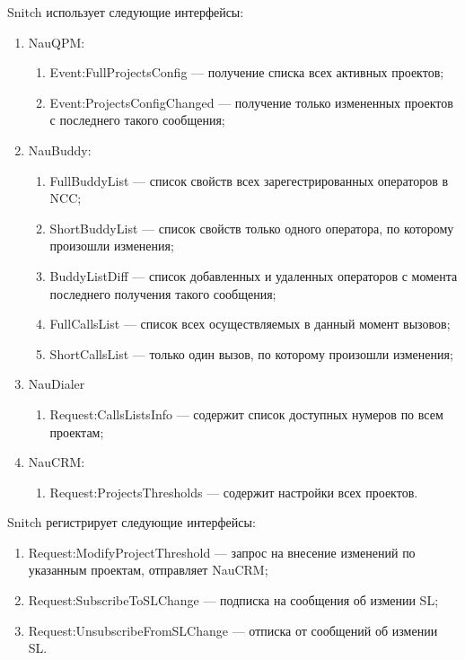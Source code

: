 Snitch использует следующие интерфейсы:
\begin{enumerate} %
    \item NauQPM:
    \begin{enumerate}
        \item Event:FullProjectsConfig --- получение списка всех активных проектов;
        \item Event:ProjectsConfigChanged --- получение только измененных проектов с последнего такого сообщения;
    \end{enumerate}
    \item NauBuddy:
    \begin{enumerate}
        \item FullBuddyList --- список свойств всех зарегестрированных операторов в NCC;
        \item ShortBuddyList --- список свойств только одного оператора, по которому произошли изменения;
        \item BuddyListDiff --- список добавленных и удаленных операторов с момента последнего получения такого сообщения;
        \item FullCallsList --- список всех осуществляемых в данный момент вызовов;
        \item ShortCallsList --- только один вызов, по которому произошли изменения;
    \end{enumerate}
    \item NauDialer
    \begin{enumerate}
        \item Request:CallsListsInfo --- содержит список доступных нумеров по всем проектам;
    \end{enumerate}
    \item NauCRM:
    \begin{enumerate}
        \item Request:ProjectsThresholds --- содержит настройки всех проектов.
    \end{enumerate}
\end{enumerate}

Snitch регистрирует следующие интерфейсы:
\begin{enumerate} %
    \item Request:ModifyProjectThreshold --- запрос на внесение изменений по указанным проектам, отправляет NauCRM;
    \item Request:SubscribeToSLChange --- подписка на сообщения об измении SL\@; %
    \item Request:UnsubscribeFromSLChange --- отписка от сообщений об измении SL\@.
\end{enumerate}

